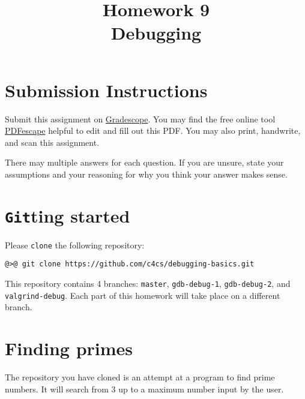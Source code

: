\documentclass{article}
\begin{document}
\fancyhead[L]{}
\fancyhead[R]{}

\fancyfoot[C]{\color{gray} \thepage~/~\pageref*{LastPage}}
\pagestyle{fancyplain}

\title{\textbf{Homework 9\\Debugging}}
\author{\textbf{\color{red}{Due: Wednesday, November 15th, 11:59PM (Hard Deadline)}}}
\date{}
\maketitle


\section*{Submission Instructions}
Submit this assignment on \href{https://gradescope.com/courses/9999}{Gradescope}.
You may find the free online tool \href{https://www.pdfescape.com}{PDFescape}
helpful to edit and fill out this PDF.
You may also print, handwrite, and scan this assignment.


There may multiple answers for each question. If you are unsure,
state your assumptions and your reasoning for why you think your answer
makes sense.


\newpage
\section{\texttt{Git}ting started}

Please \texttt{clone} the following repository:

\begin{lstlisting}
@>@ git clone https://github.com/c4cs/debugging-basics.git
\end{lstlisting}

This repository contains 4 branches: \texttt{master}, \texttt{gdb-debug-1}, \texttt{gdb-debug-2}, and \texttt{valgrind-debug}. Each part of this homework will take place on a different branch.

\section{Finding primes}

The repository you have cloned is an attempt at a program to find prime
numbers. It will search from 3 up to a maximum number input by the user.
\end{document}
